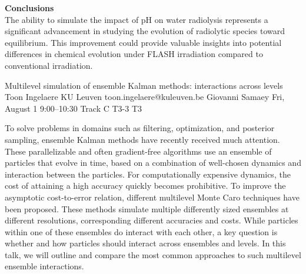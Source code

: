 \begin{talk}
\textbf{Conclusions}\\
The ability to simulate the impact of pH on water radiolysis represents a significant advancement in studying the evolution of radiolytic species toward equilibrium. This improvement could provide valuable insights into potential differences in chemical evolution under FLASH irradiation compared to conventional irradiation.


\medskip



\end{talk}

\begin{talk}
  {Multilevel simulation of ensemble Kalman methods: interactions across levels}%
  {Toon Ingelaere}%
  {KU Leuven}%
  {toon.ingelaere@kuleuven.be}%
  {Giovanni Samaey}%
  {}%
  {Fri, August 1 9:00–10:30 Track C}%
  {T3-3}%
  {T3}%
  
				

        To solve problems in domains such as filtering, optimization, and posterior sampling,
        ensemble Kalman methods have recently received much attention. These parallelizable and often gradient-free algorithms use an ensemble of particles that evolve in time, based on a combination of well-chosen dynamics and interaction between the particles. For computationally expensive dynamics, the cost of attaining a high accuracy quickly becomes prohibitive. To improve the asymptotic cost-to-error relation, different multilevel Monte Caro techniques have been proposed. These methods simulate multiple differently sized ensembles at different resolutions, corresponding different accuracies and costs. While particles within one of these ensembles do interact with each other, a key question is whether and how particles should interact across ensembles and levels.
        In this talk, we will outline and compare the most common approaches to such multilevel ensemble interactions.

\medskip

\end{talk}

